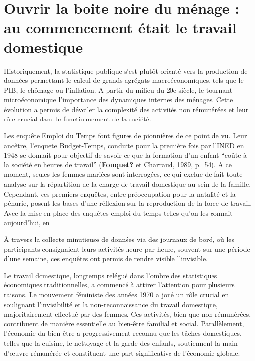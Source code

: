 \documentclass[
  12pt,
]{book}
\begin{document}
\section{Ouvrir la boite noire du ménage : au commencement était le
travail
domestique}\label{ouvrir-la-boite-noire-du-muxe9nage-au-commencement-uxe9tait-le-travail-domestique}

Historiquement, la statistique publique s'est plutôt orienté vers la
production de données permettant le calcul de grands agrégats
macroéconomiques, tels que le PIB, le chômage ou l'inflation. A partir
du milieu du 20e siècle, le tournant microéconomique l'importance des
dynamiques internes des ménages. Cette évolution a permis de dévoiler la
complexité des activités non rémunérées et leur rôle crucial dans le
fonctionnement de la société.

Les enquête Emploi du Temps font figures de pionnières de ce point de
vu. Leur ancêtre, l'enquete Budget-Temps, conduite pour la première fois
par l'INED en 1948 se donnait pour objectif de savoir ce que la
formation d'un enfant ``coûte à la société en heures de travail''
(\textbf{Fouquet?} et Charraud, 1989, p.~54). A ce moment, seules les
femmes mariées sont interrogées, ce qui exclue de fait toute analyse sur
la répartition de la charge de travail domestique au sein de la famille.
Cependant, ces premiers enquêtes, entre préoccupation pour la natalité
et la pénurie, posent les bases d'une réflexion sur la reproduction de
la force de travail. Avec la mise en place des enquêtes emploi du temps
telles qu'on les connait aujourd'hui, en

À travers la collecte minutieuse de données via des journaux de bord, où
les participants consignaient leurs activités heure par heure, souvent
sur une période d'une semaine, ces enquêtes ont permis de rendre visible
l'invisible.

Le travail domestique, longtemps relégué dans l'ombre des statistiques
économiques traditionnelles, a commencé à attirer l'attention pour
plusieurs raisons. Le mouvement féministe des années 1970 a joué un rôle
crucial en soulignant l'invisibilité et la non-reconnaissance du travail
domestique, majoritairement effectué par des femmes. Ces activités, bien
que non rémunérées, contribuent de manière essentielle au bien-être
familial et social. Parallèlement, l'économie du bien-être a
progressivement reconnu que les tâches domestiques, telles que la
cuisine, le nettoyage et la garde des enfants, soutiennent la
main-d'œuvre rémunérée et constituent une part significative de
l'économie globale.
\end{document}
